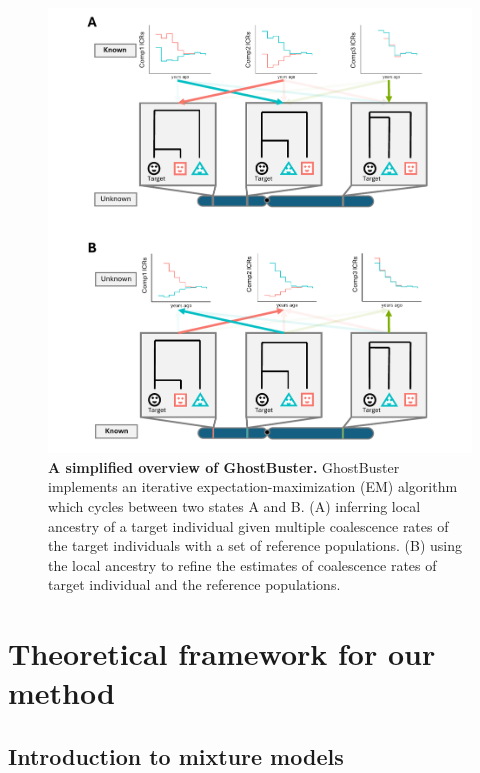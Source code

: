 
\begin{figure}[h!]
    \centering
    \includegraphics[width=\textwidth]{figures/thesis_gb_simplified_overview.pdf}
    \caption{\textbf{A simplified overview of GhostBuster.} GhostBuster implements an iterative expectation-maximization (EM) algorithm which cycles between two states A and B. (A) inferring local ancestry of a target individual given multiple coalescence rates of the target individuals with a set of reference populations. (B) using the local ancestry to refine the estimates of coalescence rates of target individual and the reference populations.}
    \label{fig:gb-simplified-overview}
\end{figure}

\section{Theoretical framework for our method}
\label{sec:ch2-gb-theory}

\subsection{Introduction to mixture models}
\label{sec:gb_intro_mixture_models}

